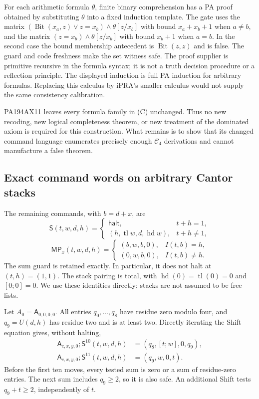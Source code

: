 For each arithmetic formula $\theta$, finite binary comprehension has a
PA proof obtained by substituting $\theta$ into a fixed induction template.
The gate uses the matrix
$(\operatorname{Bit}(x_a,z)\vee z=x_b)\wedge\theta[z/x_b]$
with bound $x_a+x_b+1$ when $a\ne b$, and the matrix
$(z=x_b)\wedge\theta[z/x_b]$ with bound $x_b+1$ when $a=b$.
In the second case the bound membership antecedent is
$\operatorname{Bit}(z,z)$ and is false. The guard and code freshness
make the set witness safe. The proof supplier is primitive recursive in
the formula syntax; it is not a truth decision procedure or a reflection
principle. The displayed induction is full PA induction for arbitrary
formulas. Replacing this calculus by iPRA's smaller calculus would not
supply the same consistency calibration.

PA194AX11 leaves every formula family in (C) unchanged. Thus no new
recoding, new logical completeness theorem, or new treatment of the
dominated axiom is required for this construction. What remains is to
show that its changed command language enumerates precisely enough
$\mathcal C_4$ derivations and cannot manufacture a false theorem.

\subsection{Exact command words on arbitrary Cantor stacks}

The remaining commands, with $b=d+x$, are
\[
 \mathsf S(t,w,d,h)=
 \begin{cases}\mathsf{halt},&t+h=1,\\
 (h,\operatorname{tl}w,d,\operatorname{hd}w),&t+h\ne1,
 \end{cases}
\]
\[
 \mathsf{MP}_x(t,w,d,h)=
 \begin{cases}(b,w,b,0),&I(t,b)=h,\\
 (0,w,b,0),&I(t,b)\ne h.
 \end{cases}                                               \tag{M}
\]
The sum guard is retained exactly. In particular, it does not halt at
$(t,h)=(1,1)$. The stack pairing is total, with
$\operatorname{hd}(0)=\operatorname{tl}(0)=0$ and $[0;0]=0$.
We use these identities directly; stacks are not assumed to be free lists.

Let $A_0=\mathsf A_{0,0,0,0}$. All entries $q_0,\ldots,q_8$ have residue
zero modulo four, and $q_9=U(d,h)$ has residue two and is at least two.
Directly iterating the Shift equation gives, without halting,
\begin{align*}
 \mathsf A_{c,x,y,0};\mathsf S^{10}(t,w,d,h)
      &=(q_8,[t;w],0,q_9),\\
 \mathsf A_{c,x,y,0};\mathsf S^{11}(t,w,d,h)
      &=(q_9,w,0,t).
\end{align*}
Before the first ten moves, every tested sum is zero or a sum of
residue-zero entries. The next sum includes $q_9\geq2$, so it is also
safe. An additional Shift tests $q_9+t\geq2$, independently of $t$.

